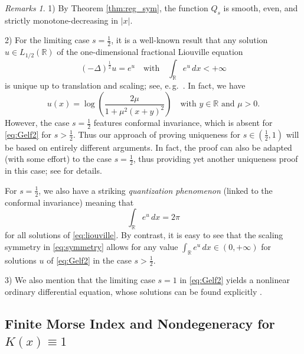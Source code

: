 \documentclass[reqno,10pt,a4paper]{amsart}
\theoremstyle{definition}
\theoremstyle{definition}
\theoremstyle{remark}
\theoremstyle{remark}
\newtheorem*{remarks*}{Remarks}
\numberwithin{equation}{section}
\newcommand{\R}{\mathbb{R}}
\newcommand{\be}{\begin{equation}}
\newcommand{\ee}{\end{equation}}
\begin{document}
\begin{remarks*}
1) By Theorem \ref{thm:reg_sym}, the function $Q_s$ is smooth, even, and strictly monotone-decreasing in $|x|$.

2) For the limiting case $s=\frac{1}{2}$, it is a well-known result  that any solution $u \in L_{1/2}(\R)$ of the one-dimensional fractional Liouville equation 
\be \tag{Liouville} \label{eq:liouville}
(-\Delta)^{\frac 1 2} u = e^u \quad \mbox{with} \quad \int_{\R} e^u \, dx < +\infty
\ee
is unique up to translation and scaling; see, e.\,g.~\cite{LiZh-95,Xu-05,DaMa-17,GeLe-24}. In fact,  we have
$$
u(x) = \log \left ( \frac{2 \mu}{1+ \mu^2 (x+y)^2} \right ) \quad \mbox{with $y \in \R$ and $\mu > 0$}.
$$
However, the case $s=\frac{1}{2}$ features conformal invariance, which is absent for \eqref{eq:Gelf2} for $s > \frac{1}{2}$. Thus our approach of proving uniqueness for $s \in (\frac{1}{2},1)$ will be based on entirely different arguments. In fact, the proof can also be adapted (with some effort) to the case $s=\frac{1}{2}$, thus providing yet another uniqueness proof in this case; see \cite{La-25} for details.

For $s=\frac{1}{2}$, we also have a striking {\em quantization phenomenon} (linked to the conformal invariance) meaning that 
$$
\int_{\R} e^u \,dx = 2 \pi
$$ 
for all solutions of \eqref{eq:liouville}. By contrast, it is easy to see that the scaling symmetry in \eqref{eq:symmetry} allows for any value $\int_{\R} e^{u} \, dx \in (0, +\infty)$ for solutions $u$ of \eqref{eq:Gelf2} in the case $s > \frac 1 2$.

3) We also mention that the limiting case $s=1$ in \eqref{eq:Gelf2} yields a nonlinear ordinary differential equation, whose solutions can be found explicitly \cite{Te-06}.
\end{remarks*}

\subsection{Finite Morse Index and Nondegeneracy for $K(x) \equiv 1$}
\end{document}
